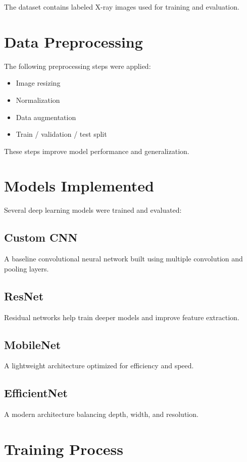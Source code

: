 \documentclass[12pt]{article}
\begin{document}
The dataset contains labeled X-ray images used for training and evaluation.

\section{Data Preprocessing}

The following preprocessing steps were applied:

\begin{itemize}
\item Image resizing
\item Normalization
\item Data augmentation
\item Train / validation / test split
\end{itemize}

These steps improve model performance and generalization.

\section{Models Implemented}

Several deep learning models were trained and evaluated:

\subsection{Custom CNN}
A baseline convolutional neural network built using multiple convolution
and pooling layers.

\subsection{ResNet}
Residual networks help train deeper models and improve feature extraction.

\subsection{MobileNet}
A lightweight architecture optimized for efficiency and speed.

\subsection{EfficientNet}
A modern architecture balancing depth, width, and resolution.

\section{Training Process}
\end{document}

